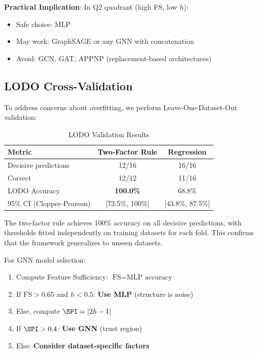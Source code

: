 \textbf{Practical Implication}: In Q2 quadrant (high FS, low $h$):
\begin{itemize}
    \item Safe choice: MLP
    \item May work: GraphSAGE or any GNN with concatenation
    \item Avoid: GCN, GAT, APPNP (replacement-based architectures)
\end{itemize}

\subsection{LODO Cross-Validation}

To address concerns about overfitting, we perform Leave-One-Dataset-Out validation:

\begin{table}[t]
\centering
\caption{LODO Validation Results}
\label{tab:lodo}
\begin{tabular}{@{}lcc@{}}
\toprule
Metric & Two-Factor Rule & Regression \\
\midrule
Decisive predictions & 12/16 & 16/16 \\
Correct & 12/12 & 11/16 \\
LODO Accuracy & \textbf{100.0\%} & 68.8\% \\
95\% CI (Clopper-Pearson) & [73.5\%, 100\%] & [43.8\%, 87.5\%] \\
\bottomrule
\end{tabular}
\end{table}

The two-factor rule achieves 100\% accuracy on all decisive predictions, with thresholds fitted independently on training datasets for each fold. This confirms that the framework generalizes to unseen datasets.

\begin{proposition}
\label{prop:unified}
For GNN model selection:
\begin{enumerate}
    \item Compute Feature Sufficiency: $\text{FS} = \text{MLP accuracy}$
    \item If $\text{FS} > 0.65$ and $h < 0.5$: \textbf{Use MLP} (structure is noise)
    \item Else, compute $\SPI = |2h - 1|$
    \item If $\SPI > 0.4$: \textbf{Use GNN} (trust region)
    \item Else: \textbf{Consider dataset-specific factors}
\end{enumerate}
\end{proposition}

